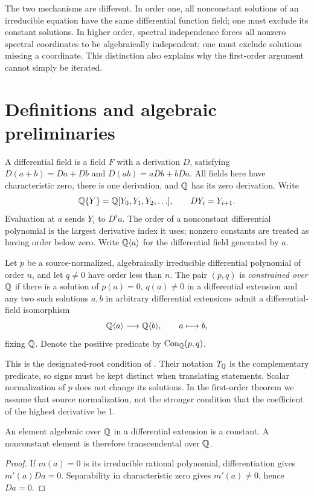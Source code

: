 \documentclass[11pt]{article}
\begin{document}
The two mechanisms are different. In order one, all nonconstant
solutions of an irreducible equation have the same differential
function field; one must exclude its constant solutions. In higher
order, spectral independence forces all nonzero spectral coordinates
to be algebraically independent; one must exclude solutions missing
a coordinate. This distinction also explains why the first-order
argument cannot simply be iterated.

\section{Definitions and algebraic preliminaries}

A differential field is a field $F$ with a derivation $D$, satisfying
$D(a+b)=Da+Db$ and $D(ab)=aDb+bDa$. All fields here have characteristic
zero, there is one derivation, and $\mathbb Q$ has its zero derivation.
Write
\[
 \mathbb Q\{Y\}=\mathbb Q[Y_0,Y_1,Y_2,\ldots],\qquad DY_i=Y_{i+1}.
\]
Evaluation at $a$ sends $Y_i$ to $D^ia$. The order of a nonconstant
differential polynomial is the largest derivative index it uses;
nonzero constants are treated as having order below zero. Write
$\mathbb Q\langle a\rangle$ for the differential field generated by $a$.

\begin{definition}\label{def:constraint}
Let $p$ be a source-normalized, algebraically irreducible
differential polynomial of order $n$, and let $q\ne0$ have order
less than $n$. The pair $(p,q)$ is \emph{constrained over $\mathbb Q$} if
there is a solution of $p(a)=0$, $q(a)\ne0$ in a differential
extension and any two such solutions $a,b$ in arbitrary differential
extensions admit a differential-field isomorphism
\[
 \mathbb Q\langle a\rangle\longrightarrow\mathbb Q\langle b\rangle,
 \qquad a\longmapsto b,
\]
fixing $\mathbb Q$. Denote the positive predicate by $\operatorname{Con}_\mathbb Q(p,q)$.
\end{definition}

This is the designated-root condition of \cite[Definition~4.3]{MOT}.
Their notation $T_\mathbb Q$ is the complementary predicate, so signs must
be kept distinct when translating statements. Scalar normalization
of $p$ does not change its solutions. In the first-order theorem
we assume that source normalization, not the stronger condition that
the coefficient of the highest derivative be 1.

\begin{lemma}\label{lem:constants}
An element algebraic over $\mathbb Q$ in a differential extension is a
constant. A nonconstant element is therefore transcendental over $\mathbb Q$.
\end{lemma}
\begin{proof}
If $m(a)=0$ is its irreducible rational polynomial, differentiation
gives $m'(a)Da=0$. Separability in characteristic zero gives
$m'(a)\ne0$, hence $Da=0$.
\end{proof}
\end{document}
